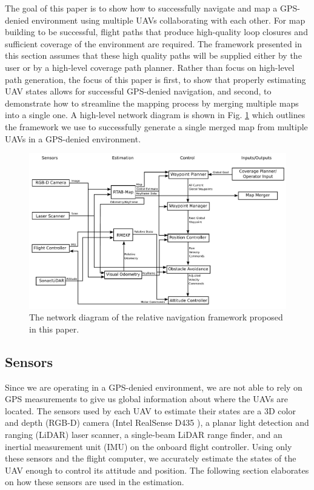 \documentclass[letterpaper, 10 pt, conference]{ieeeconf}  %
\begin{document}
The goal of this paper is to show how to successfully navigate and map a GPS-denied environment using multiple UAVs collaborating with each other. For map building to be successful, flight paths that produce high-quality loop closures and sufficient coverage of the environment are required. The framework presented in this section assumes that these high quality paths will be supplied either by the user or by a high-level coverage path planner. Rather than focus on high-level path generation, the focus of this paper is first, to show that properly estimating UAV states allows for successful GPS-denied navigation, and second, to demonstrate how to streamline the mapping process by merging multiple maps into a single one. A high-level network diagram is shown in Fig. \ref{fig:rtab_network} which outlines the framework we use to successfully generate a single merged map from multiple UAVs in a GPS-denied environment.

\begin{figure}
\centering
\includegraphics[width=1.0\linewidth]{rtab_relative_nav_network}
\caption{The network diagram of the relative navigation framework proposed in this paper.}
\label{fig:rtab_network}
\end{figure}

\subsection{Sensors}

Since we are operating in a GPS-denied environment, we are not able to rely on GPS measurements to give us global information about where the UAVs are located. The sensors used by each UAV to estimate their states are a 3D color and depth (RGB-D) camera (Intel RealSense D435 \cite{Intel}), a planar light detection and ranging (LiDAR) laser scanner, a single-beam LiDAR range finder, and an inertial measurement unit (IMU) on the onboard flight controller. Using only these sensors and the flight computer, we accurately estimate the states of the UAV enough to control its attitude and position. The following section elaborates on how these sensors are used in the estimation.
\end{document}
